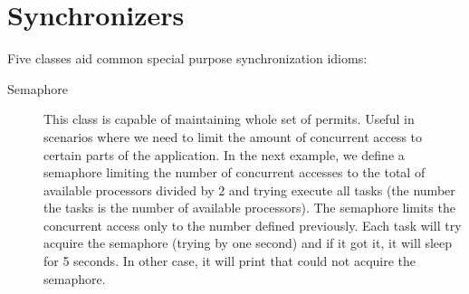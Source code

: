 \documentclass{latex/classes/myarticle}
\begin{document}
\section{Synchronizers}
\label{sec:orgb4e7d99}

Five classes aid common special purpose synchronization idioms:

\begin{description}
\item[{Semaphore}] This class is capable of maintaining whole set of
permits. Useful in scenarios where we need to limit the amount of
concurrent access to certain parts of the application. In the next example,
we define a semaphore limiting the number of concurrent accesses to the
total of available processors divided by 2 and trying execute all tasks
(the number the tasks is the number of available processors). The semaphore
limits the concurrent access only to the number defined previously. Each
task will try acquire the semaphore (trying by one second) and if it got
it, it will sleep for 5 seconds. In other case, it will print that could
not acquire the semaphore.
\end{description}
\end{document}
